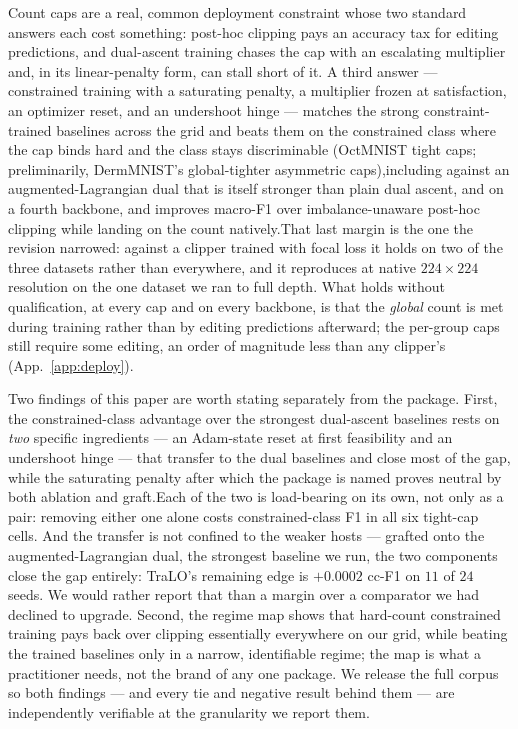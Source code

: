\documentclass[10pt]{article}
\begin{document}
Count caps are a real, common deployment constraint whose two standard
answers each cost something: post-hoc clipping pays an accuracy tax for
editing predictions, and dual-ascent training chases the cap with an
escalating multiplier and, in its linear-penalty form, can stall short of
it. A third answer --- constrained training with a saturating penalty, a
multiplier frozen at satisfaction, an optimizer reset, and an undershoot
hinge --- matches the strong constraint-trained baselines across the grid
and beats them on the constrained class where the cap binds hard and the
class stays discriminable (OctMNIST tight caps; preliminarily,
DermMNIST's global-tighter asymmetric caps),{including against an
augmented-Lagrangian dual that is itself stronger than plain dual ascent, and on a
fourth backbone,} and improves macro-F1 over
{imbalance-unaware post-hoc clipping}
while landing on the count natively.{That last margin is the one the
revision narrowed: against a clipper trained with focal loss it holds on two of the
three datasets rather than everywhere, and it reproduces at native
$224{\times}224$ resolution on the one dataset we ran to full depth. What holds
without qualification, at every cap and on every backbone, is that the
{\emph{global}} count is met
during training rather than by editing predictions afterward{; the
per-group caps still require some editing, an order of magnitude less than any
clipper's (App.~\ref{app:deploy})}.}

Two findings of this paper are worth stating separately from the
package. First, the constrained-class advantage over the strongest
dual-ascent baselines rests on \emph{two} specific ingredients --- an
Adam-state reset at first feasibility and an undershoot hinge --- that
transfer to the dual baselines and close most of the gap, while the
saturating penalty after which the package is named proves neutral by
both ablation and graft.{Each of the two is load-bearing on its own,
not only as a pair: removing either one alone costs constrained-class F1 in all
six tight-cap cells. And the transfer is not confined to the weaker hosts ---
grafted onto the augmented-Lagrangian dual, the strongest baseline we run, the
two components close the gap entirely: TraLO's remaining edge is $+0.0002$ cc-F1
on $11$ of $24$ seeds. We would rather report that than a margin over a
comparator we had declined to upgrade.} Second, the regime map shows that hard-count
constrained training pays back over clipping essentially everywhere on
our grid, while beating the trained baselines only in a narrow,
identifiable regime; the map is what a practitioner needs, not the
brand of any one package. We release the full corpus so both findings
--- and every tie and negative result behind them --- are independently
verifiable at the granularity we report them.
\end{document}
